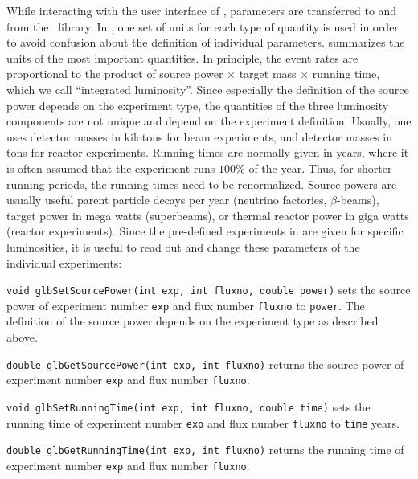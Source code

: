 While interacting with the user interface of \GLOBES , parameters are transferred to and from the \GLOBES\ library. In \GLOBES , one set of units 
for each type of quantity is used in order to avoid confusion about the definition of individual parameters.  summarizes the units of the most important quantities. In principle, the event rates are
proportional to the product of source power $\times$ target mass $\times$
 running time, which we call ``integrated luminosity''. Since especially the
 definition of the source power depends on the experiment type, the quantities of the three luminosity components
 are not unique and depend on the experiment definition. Usually,
 one uses detector masses in kilotons for beam experiments,
 and detector masses in tons for reactor experiments. Running times
 are normally given in years, where it is often assumed that the 
 experiment runs $100\%$ of the year. Thus, for shorter running periods,
 the running times need to be renormalized. Source powers are
 usually useful parent particle decays per year (neutrino factories,
 $\beta$-beams), target power in mega watts (superbeams), or thermal
 reactor power in giga watts (reactor experiments).
%
Since the pre-defined experiments in  are given for specific luminosities, it is useful to read out and change these
 parameters of the individual experiments:
\begin{function}
{\tt void glbSetSourcePower(int exp, int fluxno, double power)}
 sets the source power of experiment number {\tt exp} and flux number
 {\tt fluxno} to {\tt power}. The definition of the source power depends on the experiment type as described above.
\end{function}
\begin{function}
{\tt double glbGetSourcePower(int exp, int fluxno)}
 returns the source power of experiment number {\tt exp} and flux number
 {\tt fluxno}.
\end{function}
\begin{function}
{\tt void glbSetRunningTime(int exp, int fluxno, double time)}
 sets the running time of experiment number {\tt exp} and flux number
 {\tt fluxno} to {\tt time} years.
\end{function}
\begin{function}
{\tt double glbGetRunningTime(int exp, int fluxno)}
 returns the running time of experiment number {\tt exp} and flux number
 {\tt fluxno}.
\end{function}

